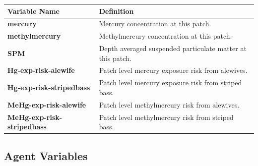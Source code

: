 \documentclass[
]{book}
\begin{document}
\begin{longtable}[]{@{}
  >{\raggedright\arraybackslash}p{}
  >{\raggedright\arraybackslash}p{}@{}}
\toprule\noalign{}
\begin{minipage}[b]{\linewidth}\raggedright
Variable Name
\end{minipage} & \begin{minipage}[b]{\linewidth}\raggedright
Definition
\end{minipage} \\
\midrule\noalign{}
\endhead
\bottomrule\noalign{}
\endlastfoot
\textbf{mercury} & Mercury concentration at this patch. \\
\textbf{methylmercury} & Methylmercury concentration at this patch. \\
\textbf{SPM} & Depth averaged suspended particulate matter at this patch. \\
\textbf{Hg-exp-risk-alewife} & Patch level mercury exposure risk from alewives. \\
\textbf{Hg-exp-risk-stripedbass} & Patch level mercury exposure risk from striped bass. \\
\textbf{MeHg-exp-risk-alewife} & Patch level methylmercury risk from alewives. \\
\textbf{MeHg-exp-risk-stripedbass} & Patch level methylmercury risk from striped bass. \\
\end{longtable}

\subsection{Agent Variables}\label{agent-variables-4}
\end{document}
